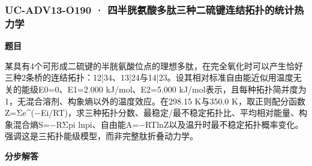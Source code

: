 \documentclass[UTF8,11pt,a4paper]{ctexart}
\begin{document}
\subsubsection*{UC-ADV13-O190 · 四半胱氨酸多肽三种二硫键连结拓扑的统计热力学}
\noindent\textbf{题目}\par
某具有4个可形成二硫键的半胱氨酸位点的理想多肽，在完全氧化时可以产生恰好三种2条桥的连结拓扑：12|34、13|24与14|23。设其相对标准自由能近似用温度无关的能级E0=0、E1=2.000 kJ/mol、E2=5.000 kJ/mol表示，且每种拓扑简并度为1，无混合溶剂、构象熵以外的温度效应。在298.15 K与350.0 K，取正则配分函数Z=Σe\textasciicircum{}(−Ei/RT)，求三种拓扑分数、最稳定/最不稳定拓扑比、平均相对能量、构象混合熵S=−RΣpi lnpi、自由能A=−RTlnZ以及温升时最不稳定拓扑概率变化。强调这是三拓扑能级模型，而非完整肽折叠动力学。\par
\medskip\noindent\textbf{分步解答}
\end{document}
